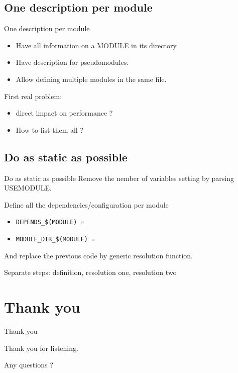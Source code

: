 \documentclass[ucs,9pt]{beamer}
\begin{document}
\subsection{One description per module}

\begin{frame}{One description per module}

  \begin{itemize}
    \item
      Have all information on a MODULE in its directory
    \item
      Have description for pseudomodules.
    \item
      Allow defining multiple modules in the same file.
  \end{itemize}

  \pause
  First real problem:
  \begin{itemize}
    \item
      direct impact on performance ?
    \item
      How to list them all ?
  \end{itemize}

\end{frame}


\subsection{Do as static as possible}

\begin{frame}{Do as static as possible}
  Remove the nember of variables setting by parsing USEMODULE.

  \bigskip
  Define all the dependencies/configuration per module
  \begin{itemize}
    \item
      \texttt{DEPENDS\_\$(MODULE) = }
    \item
      \texttt{MODULE\_DIR\_\$(MODULE) = }
  \end{itemize}

  And replace the previous code by generic resolution function.

  \bigskip
  Separate steps: definition, resolution one, resolution two

\end{frame}

\section{Thank you}

\begin{frame}{Thank you}

  Thank you for listening.

  \bigskip \pause
  Any questions ?
\end{frame}
\end{document}

